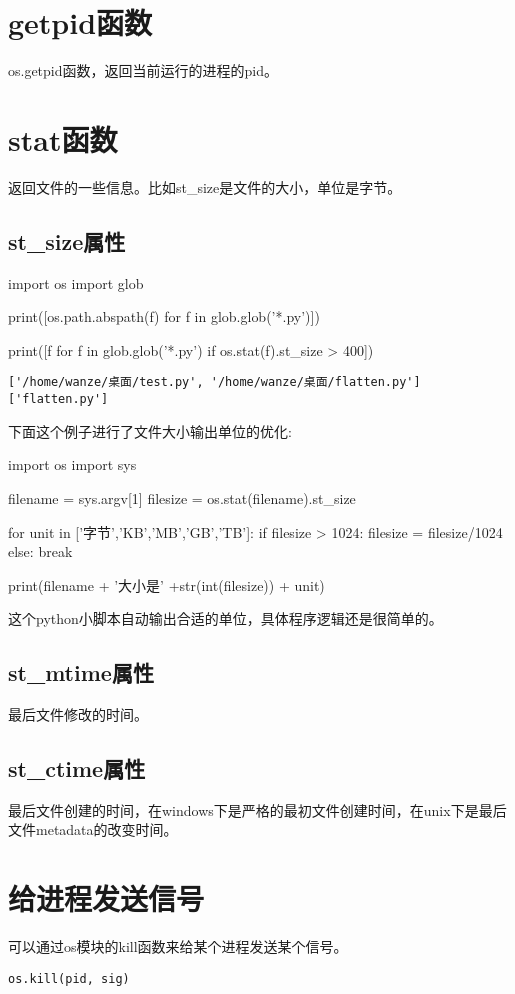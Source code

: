 \documentclass[12pt,oneside]{book}
\begin{document}
\begin{common-format}
\section{getpid函数}
os.getpid函数，返回当前运行的进程的pid。

\section{stat函数}
返回文件的一些信息。比如st\_{}size是文件的大小，单位是字节。


\subsection{st\_{}size属性}
\begin{tcbpython}[]
import os
import glob

print([os.path.abspath(f) for f in glob.glob('*.py')])

print([f for f in glob.glob('*.py') if os.stat(f).st_size > 400])
\end{tcbpython}
\begin{Verbatim}
['/home/wanze/桌面/test.py', '/home/wanze/桌面/flatten.py']
['flatten.py']
\end{Verbatim}

下面这个例子进行了文件大小输出单位的优化: 
\begin{tcbpython}[]
import os
import sys

filename = sys.argv[1]
filesize = os.stat(filename).st_size

for unit in ['字节','KB','MB','GB','TB']:
    if filesize > 1024:
        filesize = filesize/1024
    else:
        break

print(filename + '大小是' +str(int(filesize)) + unit)
\end{tcbpython}
这个python小脚本自动输出合适的单位，具体程序逻辑还是很简单的。

\subsection{st\_{}mtime属性}
最后文件修改的时间。

\subsection{st\_{}ctime属性}
最后文件创建的时间，在windows下是严格的最初文件创建时间，在unix下是最后文件metadata的改变时间。

\section{给进程发送信号}
可以通过os模块的kill函数来给某个进程发送某个信号。
\begin{Verbatim}
os.kill(pid, sig)
\end{Verbatim}


\end{common-format}
\end{document}
